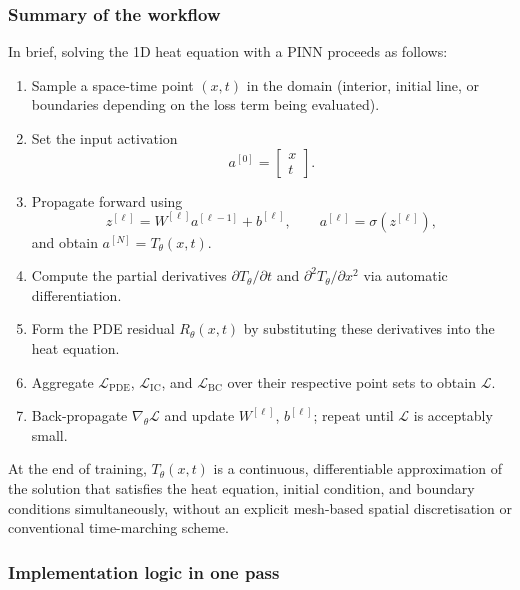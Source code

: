 \documentclass[11pt,letterpaper]{article}
\begin{document}
\subsubsection*{Summary of the workflow}

In brief, solving the 1D heat equation with a PINN proceeds as follows:
\begin{enumerate}[label=(\roman*)]
    \item Sample a space-time point $(x, t)$ in the domain (interior, initial line, or boundaries
          depending on the loss term being evaluated).
    \item Set the input activation
        \[
        a^{[0]} = \begin{bmatrix}x \\ t\end{bmatrix}.
        \]
    \item Propagate forward using
        \[
        z^{[\ell]} = W^{[\ell]} a^{[\ell-1]} + b^{[\ell]}, \qquad
        a^{[\ell]} = \sigma\!\left(z^{[\ell]}\right),
        \]
        and obtain $a^{[N]} = T_\theta(x,t)$.
    \item Compute the partial derivatives $\partial T_\theta / \partial t$ and
        $\partial^2 T_\theta / \partial x^2$ via automatic differentiation.
    \item Form the PDE residual $R_\theta(x,t)$ by substituting these derivatives into
        the heat equation.
    \item Aggregate $\mathcal{L}_{\mathrm{PDE}}$, $\mathcal{L}_{\mathrm{IC}}$, and $\mathcal{L}_{\mathrm{BC}}$ over
        their respective point sets to obtain $\mathcal{L}$.
    \item Back-propagate $\nabla_\theta \mathcal{L}$ and update $W^{[\ell]}$, $b^{[\ell]}$; repeat until
        $\mathcal{L}$ is acceptably small.
\end{enumerate}
At the end of training, $T_\theta(x,t)$ is a continuous, differentiable approximation of
the solution that satisfies the heat equation, initial condition, and boundary conditions
simultaneously, without an explicit mesh-based spatial discretisation or conventional time-marching scheme.

\subsubsection*{Implementation logic in one pass}
\end{document}
